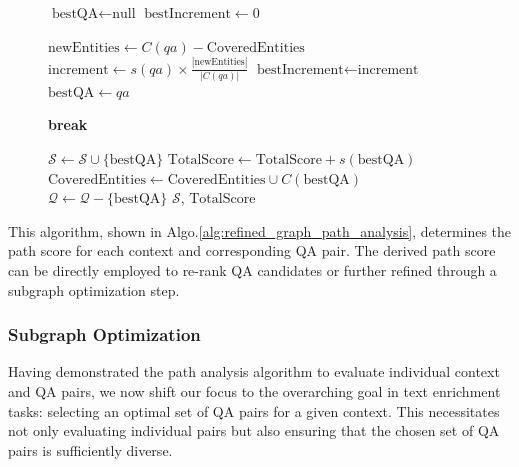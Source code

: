 \documentclass[11pt]{article}
\begin{document}
\begin{figure}[ht]
\begin{minipage}{.5\textwidth}
\begin{algorithm}[H]
\begin{algorithmic}[1]
                    \STATE $\text{bestQA} \gets \text{null}$
                    \STATE $\text{bestIncrement} \gets 0$
                    
                        \STATE $\text{newEntities} \gets C(qa) - \text{CoveredEntities}$
                            \STATE $\text{increment} \gets s(qa) \times \frac{|\text{newEntities}|}{|C(qa)|}$
                                \STATE $\text{bestIncrement} \gets \text{increment}$
                                \STATE $\text{bestQA} \gets qa$
                            \ENDIF
                        \ENDIF
                    \ENDFOR
                    
                        \STATE \textbf{break}
                    \ENDIF
                
                    \STATE $\mathcal{S} \gets \mathcal{S} \cup \{\text{bestQA}\}$
                    \STATE $\text{TotalScore} \gets \text{TotalScore} + s(\text{bestQA})$
                    \STATE $\text{CoveredEntities} \gets \text{CoveredEntities} \cup C(\text{bestQA})$
                    \STATE $\mathcal{Q} \gets \mathcal{Q} - \{\text{bestQA}\}$
                \RETURN $\mathcal{S}$, $\text{TotalScore}$
                \ENDWHILE
            \end{algorithmic}
        \end{algorithm}
    \end{minipage}
\end{figure}

This algorithm, shown in Algo.\ref{alg:refined_graph_path_analysis}, determines the path score for each context and corresponding QA pair. The derived path score can be directly employed to re-rank QA candidates or further refined through a subgraph optimization step.





\subsubsection{Subgraph Optimization}
\label{subsec:subgraph_optimization}



Having demonstrated the path analysis algorithm to evaluate individual context and QA pairs, we now shift our focus to the overarching goal in text enrichment tasks: selecting an optimal set of QA pairs for a given context. This necessitates not only evaluating individual pairs but also ensuring that the chosen set of QA pairs is sufficiently diverse. 
\end{document}
